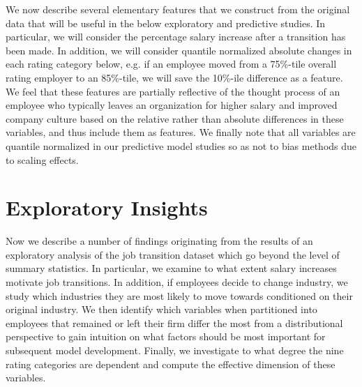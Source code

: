 \documentclass[10pt]{article}
\begin{document}
We now describe several elementary features that we construct from the original data that 
will be useful in the below exploratory and predictive studies.  In particular, we will 
consider the percentage salary increase after a transition has been made. 
In addition, we will consider quantile normalized absolute changes in each rating 
category below, e.g. if an employee moved from a 75\%-tile overall rating employer 
to an 85\%-tile, we will save the 10\%-ile difference as a feature.  We feel that these 
features are partially reflective of the thought process of an employee who typically leaves an organization 
for higher salary and improved company culture based on the relative rather than absolute 
differences in these variables, and thus include them as features.  We finally note that 
all variables are quantile normalized in our predictive model studies so as not to bias 
methods due to scaling effects.

\section{Exploratory Insights} \label{datstu}

Now we describe a number of findings originating from the results of an exploratory analysis of 
the job transition dataset which go beyond the level of summary statistics.  In particular, 
we examine to what extent salary increases motivate job transitions.  In addition, if employees decide to 
change industry, we study which industries they are most likely to move towards conditioned 
on their original industry.  We then 
identify which variables when partitioned into employees that remained or left their 
firm differ the most from a distributional perspective to gain intuition on what 
factors should be most important for subsequent model development.  Finally, 
we investigate to what degree the nine rating categories are dependent and 
compute the effective dimension of these variables.
\end{document}
